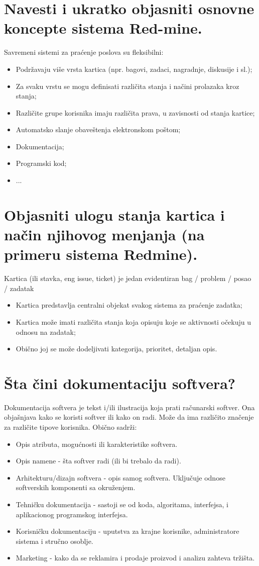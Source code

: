 \documentclass[a4paper]{article}
\begin{document}
\section{Navesti i ukratko objasniti osnovne koncepte sistema Red-mine.}
  Savremeni sistemi za praćenje poslova su fleksibilni:
  \begin{itemize}
    \item Podržavaju više vrsta kartica (npr. bagovi, zadaci, nagradnje, diskusije i sl.);
    \item Za svaku vrstu se mogu definisati različita stanja i načini prolazaka kroz stanja;
    \item Različite grupe korisnika imaju različita prava, u zavisnosti od stanja kartice;
    \item Automatsko slanje obaveštenja elektronskom poštom;
    \item Dokumentacija;
    \item Programski kod;
    \item ...
  \end{itemize}
  
\section{Objasniti ulogu stanja kartica i način njihovog menjanja (na primeru sistema Redmine).}
  Kartica (ili stavka, eng issue, ticket) je jedan evidentiran bag / problem / posao / zadatak
  \begin{itemize}
      \item Kartica predstavlja centralni objekat svakog sistema za praćenje zadatka;
      \item Kartica može imati različita stanja koja opisuju koje se aktivnosti očekuju 
            u odnosu na zadatak;
      \item Obično joj se može dodeljivati kategorija, prioritet, detaljan opis.
  \end{itemize}
\section{Šta čini dokumentaciju softvera?}
  Dokumentacija softvera je tekst i/ili ilustracija koja prati računarski softver. 
  Ona objašnjava kako se koristi softver ili kako on radi. Može da ima različito značenje za 
  različite tipove korisnika.
  Obično sadrži:
  \begin{itemize}
    \item Opis atributa, mogućnosti ili karakteristike softvera.
    \item Opis namene - šta softver radi (ili bi trebalo da radi).
    \item Arhitekturu/dizajn softvera - opis samog softvera. Uključuje odnose 
          softverskih komponenti sa okruženjem.
    \item Tehničku dokumentacija - sastoji se od koda, algoritama, interfejsa, i 
          aplikacionog programskog interfejsa.
    \item Korisničku dokumentaciju - uputstva za krajne korisnike, administratore sistema i 
          stručno osoblje.
    \item Marketing - kako da se reklamira i prodaje proizvod i analizu zahteva tržišta.
  \end{itemize}
\end{document}
